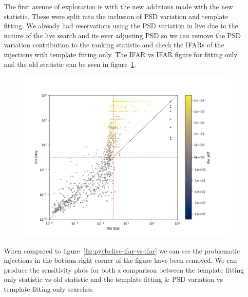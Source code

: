 The first avenue of exploration is with the new additions made with the new statistic. These were split into the inclusion of PSD variation and template fitting. We already had reservations using the PSD variation in live due to the nature of the live search and its ever adjusting PSD so we can remove the PSD variation contribution to the ranking statistic and check the IFARs of the injections with template fitting only. The IFAR vs IFAR figure for fitting only and the old statistic can be seen in figure~\ref{fig:pycbclive-fits-only-ifar-vs-ifar}.
%
\begin{figure}
       \centering
    \includegraphics[width=1.2\textwidth]{images/pycbclive/ifar_vs_ifar_fits_only_old.png}
    \caption{}
    \label{fig:pycbclive-fits-only-ifar-vs-ifar}
\end{figure}
%
When compared to figure~\ref{fig:pycbclive-ifar-vs-ifar} we can see the problematic injections in the bottom right corner of the figure have been removed. We can produce the sensitivity plots for both a comparison between the template fitting only statistic vs old statistic and the template fitting \& PSD variation vs template fitting only searches.
%
